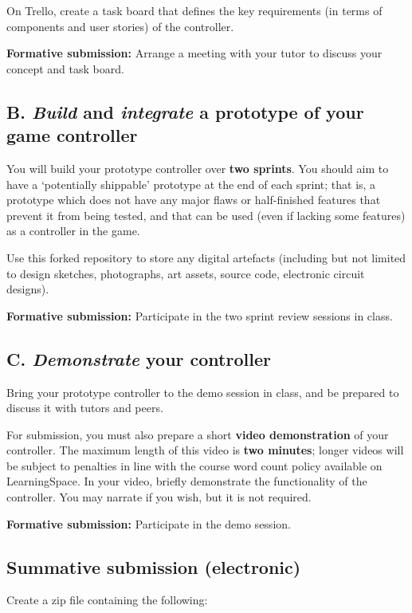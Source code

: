 \documentclass{../fal_assignment}
\begin{document}
On Trello, create a task board that defines the key requirements
(in terms of components and user stories) of the controller.

\textbf{Formative submission:} Arrange a meeting with your tutor to discuss your concept and task board.

\subsection*{B. \emph{Build} and  \emph{integrate} a prototype of your game controller}

You will build your prototype controller over \textbf{two sprints}.
You should aim to have a `potentially shippable' prototype at the end of each sprint;
that is, a prototype which does not have any major flaws or half-finished features that prevent it from being tested,
and that can be used (even if lacking some features) as a controller in the game.

Use this forked repository to store any digital artefacts (including but not limited to
design sketches, photographs, art assets, source code, electronic circuit designs).

\textbf{Formative submission:} Participate in the two sprint review sessions in class.

\subsection*{C. \emph{Demonstrate} your controller}

Bring your prototype controller to the demo session in class,
and be prepared to discuss it with tutors and peers.

For submission, you must also prepare a short \textbf{video demonstration} of your controller.
The maximum length of this video is \textbf{two minutes};
longer videos will be subject to penalties in line with the course word count policy available on LearningSpace.
In your video, briefly demonstrate the functionality of the controller.
You may narrate if you wish, but it is not required.

\textbf{Formative submission:} Participate in the demo session.

\subsection*{Summative submission (electronic)}

Create a zip file containing the following:
\end{document}

